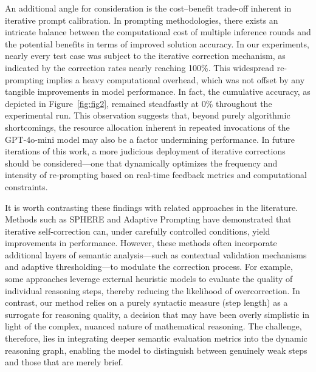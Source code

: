 \documentclass[11pt]{article}
\begin{document}
An additional angle for consideration is the cost–benefit trade-off inherent in iterative prompt calibration. In prompting methodologies, there exists an intricate balance between the computational cost of multiple inference rounds and the potential benefits in terms of improved solution accuracy. In our experiments, nearly every test case was subject to the iterative correction mechanism, as indicated by the correction rates nearly reaching 100\%. This widespread re-prompting implies a heavy computational overhead, which was not offset by any tangible improvements in model performance. In fact, the cumulative accuracy, as depicted in Figure~\ref{fig:fig2}, remained steadfastly at 0\% throughout the experimental run. This observation suggests that, beyond purely algorithmic shortcomings, the resource allocation inherent in repeated invocations of the GPT-4o-mini model may also be a factor undermining performance. In future iterations of this work, a more judicious deployment of iterative corrections should be considered—one that dynamically optimizes the frequency and intensity of re-prompting based on real-time feedback metrics and computational constraints.

It is worth contrasting these findings with related approaches in the literature. Methods such as SPHERE and Adaptive Prompting have demonstrated that iterative self-correction can, under carefully controlled conditions, yield improvements in performance. However, these methods often incorporate additional layers of semantic analysis—such as contextual validation mechanisms and adaptive thresholding—to modulate the correction process. For example, some approaches leverage external heuristic models to evaluate the quality of individual reasoning steps, thereby reducing the likelihood of overcorrection. In contrast, our method relies on a purely syntactic measure (step length) as a surrogate for reasoning quality, a decision that may have been overly simplistic in light of the complex, nuanced nature of mathematical reasoning. The challenge, therefore, lies in integrating deeper semantic evaluation metrics into the dynamic reasoning graph, enabling the model to distinguish between genuinely weak steps and those that are merely brief.
\end{document}
